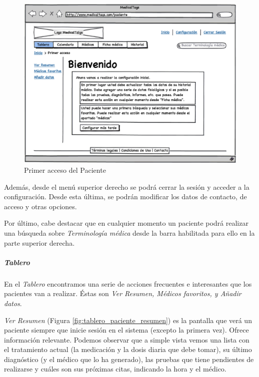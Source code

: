 \documentclass[a4paper,oneside,11pt]{book}
\begin{document}
		\begin{figure}[H]
		  \centering
		    \includegraphics[width=12cm]{img/eps/25_Tablero_Paciente.eps}
		  \caption{Primer acceso del Paciente}
		  \label{fig:tablero_paciente_inicial}
		\end{figure}
	
		Además, desde el menú superior derecho se podrá cerrar la sesión y acceder a la configuración. Desde esta última, se podrán modificar los datos de contacto, de acceso y otras opciones.
		
		 Por último, cabe destacar que en cualquier momento un paciente podrá realizar una búsqueda sobre \textit{Terminología médica} desde la barra habilitada para ello en la parte superior derecha.
	
		\subparagraph{Tablero} %
		\label{par:paciente_tablero}
		En el \textit{Tablero} encontramos una serie de acciones frecuentes e interesantes que los pacientes van a realizar. Éstas son \textit{Ver Resumen, Médicos favoritos, y Añadir datos}.
		
		\textit{Ver Resumen} (Figura \ref{fig:tablero_paciente_resumen}) es la pantalla que verá un paciente siempre que inicie sesión en el sistema (excepto la primera vez). Ofrece información relevante. Podemos observar que a simple vista vemos una lista con el tratamiento actual (la medicación y la dosis diaria que debe tomar), su último diagnóstico (y el médico que lo ha generado), las pruebas que tiene pendientes de realizarse y cuáles son sus próximas citas, indicando la hora y el médico.
	
\end{document}
